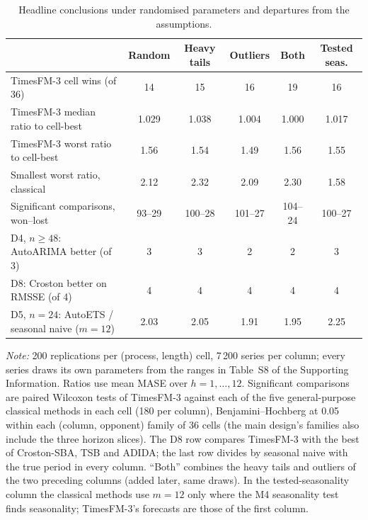 \begin{table}[!htbp]
\centering
\begin{threeparttable}
\caption{Headline conclusions under randomised parameters and departures from the assumptions.}
\label{tab:robust-design}
\small\setlength{\tabcolsep}{4pt}
\begin{tabular}{lccccc}
\toprule
 & Random & Heavy tails & Outliers & Both & Tested seas. \\
\midrule
TimesFM-3 cell wins (of 36) & 14 & 15 & 16 & 19 & 16 \\
TimesFM-3 median ratio to cell-best & 1.029 & 1.038 & 1.004 & 1.000 & 1.017 \\
TimesFM-3 worst ratio to cell-best & 1.56 & 1.54 & 1.49 & 1.56 & 1.55 \\
Smallest worst ratio, classical & 2.12 & 2.32 & 2.09 & 2.30 & 1.58 \\
Significant comparisons, won--lost & 93--29 & 100--28 & 101--27 & 104--24 & 100--27 \\
D4, $n \geq 48$: AutoARIMA better (of 3) & 3 & 3 & 2 & 2 & 3 \\
D8: Croston better on RMSSE (of 4) & 4 & 4 & 4 & 4 & 4 \\
D5, $n = 24$: AutoETS / seasonal naive ($m = 12$) & 2.03 & 2.05 & 1.91 & 1.95 & 2.25 \\
\bottomrule
\end{tabular}
\begin{tablenotes}[flushleft]\footnotesize
\item \textit{Note:} 200 replications per (process, length) cell, 7\,200 series per column; every series draws its own parameters from the ranges in Table~S8 of the Supporting Information. Ratios use mean MASE over $h = 1, \dots, 12$. Significant comparisons are paired Wilcoxon tests of TimesFM-3 against each of the five general-purpose classical methods in each cell (180 per column), Benjamini--Hochberg at 0.05 within each (column, opponent) family of 36 cells (the main design's families also include the three horizon slices). The D8 row compares TimesFM-3 with the best of Croston-SBA, TSB and ADIDA; the last row divides by seasonal naive with the true period in every column. ``Both'' combines the heavy tails and outliers of the two preceding columns (added later, same draws). In the tested-seasonality column the classical methods use $m = 12$ only where the M4 seasonality test finds seasonality; TimesFM-3's forecasts are those of the first column.
\end{tablenotes}
\end{threeparttable}
\end{table}
